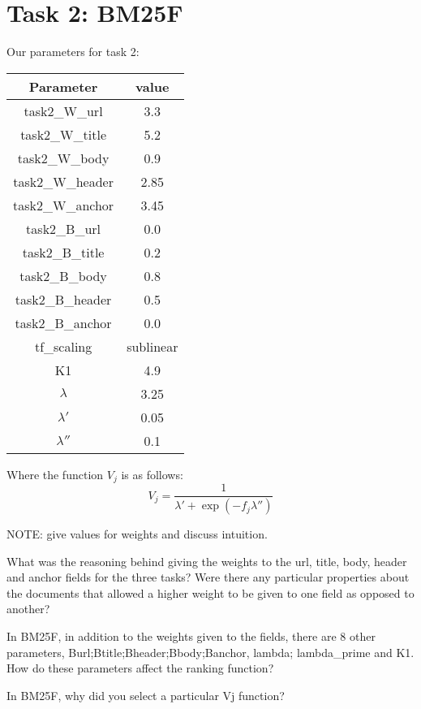 \documentclass[10pt,twocolumn]{article}
\begin{document}
\section{Task 2: BM25F}
Our parameters for task 2:
\begin{table}[H]
\centering
\begin{tabular}{|c|c|}
\hline
Parameter & value \\\hline
task2\_W\_url & 3.3\\\hline
task2\_W\_title & 5.2\\\hline
task2\_W\_body & 0.9\\\hline
task2\_W\_header & 2.85\\\hline
task2\_W\_anchor & 3.45\\\hline
task2\_B\_url & 0.0\\\hline
task2\_B\_title & 0.2\\\hline
task2\_B\_body & 0.8\\\hline
task2\_B\_header & 0.5\\\hline
task2\_B\_anchor & 0.0\\\hline
tf\_scaling & sublinear\\\hline
K1 & 4.9\\\hline
$\lambda$ & 3.25\\\hline
$\lambda'$ & 0.05\\\hline
$\lambda''$ & 0.1\\\hline
\end{tabular}
\end{table}
Where the function $V_j$ is as follows:
\begin{equation*}
V_j = \frac{1}{\lambda'+\exp({-f_j\lambda''})}
\end{equation*}

NOTE: give values for weights and discuss intuition.

What was the reasoning behind giving the weights to the url, title,
body, header and anchor fields for the three tasks? Were there any
particular properties about the documents that allowed a higher weight
to be given to one field as opposed to another?

In BM25F, in addition to the weights given to the fields, there are
8 other parameters, Burl;Btitle;Bheader;Bbody;Banchor, lambda; lambda\_prime and K1.
How do these parameters affect the ranking function?

In BM25F, why did you select a particular Vj function?
\end{document}
